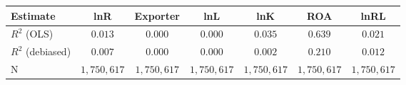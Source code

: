 \begin{tabular}{l*{6}{c}}
\hline\hline
 Estimate & lnR & Exporter & lnL & lnK & ROA & lnRL \\
\hline
\addlinespace $ R^2$ (OLS) & $0.013$ & $0.000$ & $0.000$ & $0.035$ & $0.639$ & $0.021$ \\
$ R^2$ (debiased) & $0.007$ & $0.000$ & $0.000$ & $0.002$ & $0.210$ & $0.012$ \\
N & $1,750,617$ & $1,750,617$ & $1,750,617$ & $1,750,617$ & $1,750,617$ & $1,750,617$ \\
\hline\hline
\end{tabular}
